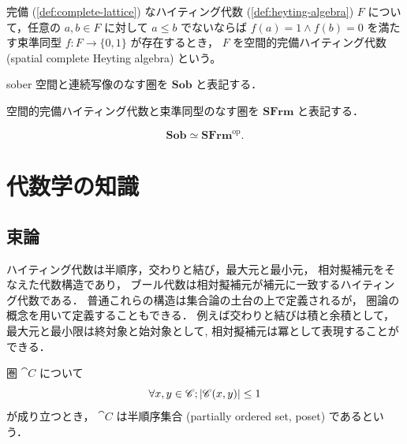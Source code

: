 \documentclass[titlepage]{ltjsreport}
\newtheorem[S]{theorem}{定理}[chapter]
\newtheorem[S]{definition}[theorem]{定義}
\newtheorem[S]{example}[theorem]{例}
\begin{document}
\begin{definition}[空間的完備ハイティング代数]
  完備
  (\cref{def:complete-lattice})
  なハイティング代数
  (\cref{def:heyting-algebra})
  $F$
  について，任意の
  $a,b\in F$
  に対して
  $a\le b$
  でないならば
  $f(a)=1\wedge f(b)=0$
  を満たす束準同型
  $f:F\to\{0,1\}$
  が存在するとき，
  $F$
  を空間的完備ハイティング代数
  (spatial complete Heyting algebra)
  という。
\end{definition}

\newcommand{\sob}{\mathbf{Sob}}
\newcommand{\sfrm}{\mathbf{SFrm}}

\begin{definition}
  sober 空間と連続写像のなす圏を $\sob$ と表記する．
\end{definition}

\begin{definition}[空間的完備ハイティング代数の圏]
  空間的完備ハイティング代数と束準同型のなす圏を $\sfrm$ と表記する．
\end{definition}

\begin{theorem}[ストーンの双対性定理]
  \begin{equation}
    \sob\simeq\sfrm^\mathrm{op}.
  \end{equation}
\end{theorem}

\appendix

\chapter{代数学の知識}

\section{束論}

ハイティング代数は半順序，交わりと結び，最大元と最小元，
相対擬補元をそなえた代数構造であり，
ブール代数は相対擬補元が補元に一致するハイティング代数である．
普通これらの構造は集合論の土台の上で定義されるが，
圏論の概念を用いて定義することもできる．
例えば交わりと結びは積と余積として，最大元と最小限は終対象と始対象として,
相対擬補元は冪として表現することができる．

\begin{definition}[半順序集合]
  圏 $\cat{C}$ について
  \begin{equation}
    \forall x,y\in\mathscr{C};|\mathscr{C}(x,y)|\le1
  \end{equation}
  が成り立つとき，
  $\cat{C}$ は半順序集合 (partially ordered set, poset)
  であるという．
\end{definition}
\end{document}
